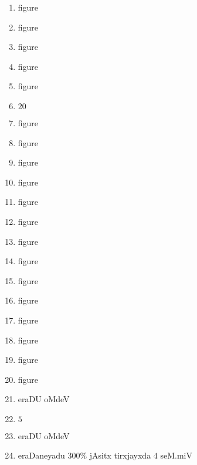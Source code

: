 \begin{enumerate}
\item {\rm figure}
  

\item {\rm figure}

\item {\rm figure}

\item {\rm figure}

\item {\rm figure}

\item $20$

\item {\rm figure}

\item {\rm figure}

\item {\rm figure}

\item {\rm figure}

\item {\rm figure}

\item {\rm figure}

\item {\rm figure}

\item {\rm figure}

\item {\rm figure}

\item {\rm figure}

\item {\rm figure}

\item {\rm figure}

\item {\rm figure}

\item {\rm figure}

\item eraDU oMdeV

\item  $5$

\item eraDU oMdeV 

\item eraDaneyadu $300\%$ jAsitx tirxjayxda $4$ seM.miV
 
\end{enumerate}
